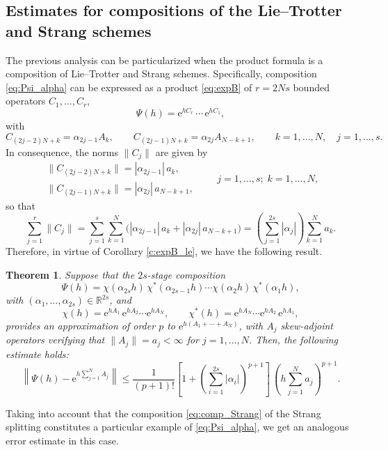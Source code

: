 \documentclass[11pt]{article}
\newcommand{\e}{\ensuremath{\mathrm{e}}}
\newtheorem{theorem}[lemma]{Theorem}
\begin{document}
\subsection{Estimates for compositions of the Lie--Trotter and Strang schemes}

The previous analysis can be particularized when the product formula is a composition of Lie--Trotter and Strang schemes.
Specifically, composition \eqref{eq:Psi_alpha} can be expressed as a product \eqref{eq:expB} of $r = 2Ns$
bounded operators $C_1, \ldots, C_r$,
\[
  \Psi(h) = \e^{h C_r} \, \cdots \, \e^{h C_1},
\]
with
\[
  C_{(2j-2)N + k} = \alpha_{2j-1} A_k, \qquad  C_{(2j-1)N + k} = \alpha_{2j} A_{N-k+1}, \qquad k=1,\ldots,N, \quad j=1, \ldots, s.
\]
In consequence, the norms $ \| C_j \|$ are given by
\[
\begin{array}{l}
  \| C_{(2j-2)N + k}\| = |\alpha_{2j-1}| \, a_k, \\
    \|C_{(2j-1)N + k}\| = |\alpha_{2j}| \, a_{N-k+1}, 
 \end{array}   
    \qquad j=1, \ldots, s; \;  k=1,\ldots,N,
\]
so that
\[
\sum_{j=1}^r \|C_j\| = \sum_{j=1}^s \sum_{k=1}^N \Big( |\alpha_{2j-1}| \, a_k + |\alpha_{2j}| \, a_{N-k+1} \Big) = 
  \left( \sum_{j=1}^{2s} | \alpha_j| \right) \sum_{k=1}^N a_k.
\]
Therefore, in virtue of Corollary \ref{c:expB_le}, we have the following result.
\begin{theorem} \label{th_compoLT}
Suppose that the $2s$-stage composition 
\[
\Psi(h) = \chi(\alpha_{2s} h) \, \chi^*(\alpha_{2s-1} h) \cdots \chi(\alpha_2 h) \, \chi^*(\alpha_1 h),
\]
with $(\alpha_1, \ldots, \alpha_{2s}) \in \mathbb{R}^{2s}$, and
\[
  \chi(h) = \e^{h A_1} \, \e^{h A_2} \cdots \e^{h A_N}, \qquad \chi^*(h) = \e^{h A_N} \cdots \e^{h A_2} \, \e^{h A_1}, 
\]
 provides an approximation of order $p$ to $\e^{h(A_1 + \cdots + A_N)}$,
with $A_j$ skew-adjoint operators verifying that $\|A_j\| = a_j < \infty$ for $j=1,\ldots, N$. Then, the following estimate holds:
\begin{equation}  \label{eq_a1}
  \left\|\Psi(h)-\e^{h \sum_{j=1}^N A_j} \right\| \le \frac{1}{(p+1)!} \left[ 1 +  \left( \sum_{i=1}^{2s} |\alpha_i| \right)^{p+1} \right] \, \left(h \sum_{j=1}^N a_j \right)^{p+1}.
\end{equation}
\end{theorem}
Taking into account that the composition \eqref{eq:comp_Strang} of the Strang splitting constitutes a particular example of \eqref{eq:Psi_alpha}, we get an analogous
error estimate in this case.
\end{document}
